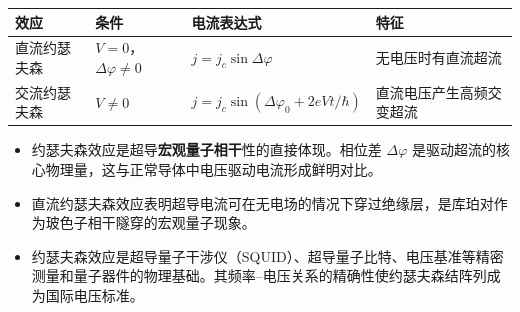 \begin{formulabox}[答案汇总]
\begin{center}
\begin{tabular}{llll}
\toprule
\textbf{效应} & \textbf{条件} & \textbf{电流表达式} & \textbf{特征} \\
\midrule
直流约瑟夫森 & $V=0$，$\Delta\varphi\neq0$ & $j=j_c\sin\Delta\varphi$ & 无电压时有直流超流 \\
交流约瑟夫森 & $V\neq0$ & $j=j_c\sin(\Delta\varphi_0+2eVt/\hbar)$ & 直流电压产生高频交变超流 \\
\bottomrule
\end{tabular}
\end{center}
\end{formulabox}

\begin{insightbox}[物理图像]
\begin{itemize}
    \item 约瑟夫森效应是超导\textbf{宏观量子相干}性的直接体现。相位差 $\Delta\varphi$ 是驱动超流的核心物理量，这与正常导体中电压驱动电流形成鲜明对比。
    \item 直流约瑟夫森效应表明超导电流可在无电场的情况下穿过绝缘层，是库珀对作为玻色子相干隧穿的宏观量子现象。
    \item 约瑟夫森效应是超导量子干涉仪（SQUID）、超导量子比特、电压基准等精密测量和量子器件的物理基础。其频率--电压关系的精确性使约瑟夫森结阵列成为国际电压标准。
\end{itemize}
\end{insightbox}
